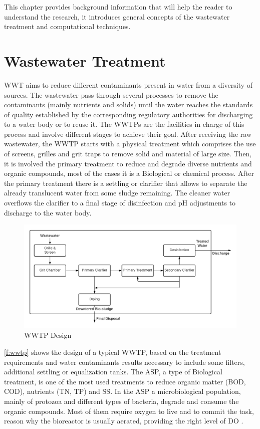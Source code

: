 This chapter provides background information that will help the reader to understand the research, it introduces general concepts of the wastewater treatment and computational techniques. 

\section{Wastewater Treatment}
\label{s:First-Background-Topic}

\ac{WWT} aims to reduce different contaminants present in water from a diversity of sources. The wastewater pass through several processes to remove the contaminants (mainly nutrients and solids) until the water reaches the standards of quality established by the corresponding regulatory authorities for discharging to a water body or to reuse it. The \ac{WWTP}s are the facilities in charge of this process and involve different stages to achieve their goal. After receiving the raw wastewater, the \ac{WWTP} starts with a physical treatment which comprises the use of screens, grilles and grit traps to remove solid and material of large size. Then, it is involved the primary treatment to reduce and degrade diverse nutrients and organic compounds, most of the cases it is a Biological or chemical process. After the primary treatment there is a settling or clarifier that allows to separate the already translucent water from some sludge remaining. The cleaner water overflows the clarifier to a final stage of disinfection and pH adjustments to discharge to the water body.

\begin{figure}[h]
\centering
\includegraphics[width=14cm]{figures/Ch2/WWTP.png}
\caption{WWTP Design}
\label{f:wwtp}
\end{figure}

\autoref{f:wwtp} shows the design of a typical \ac{WWTP}, based on the treatment requirements and water contaminants results necessary to include some filters, additional settling or equalization tanks.
The \ac{ASP}, a type of Biological treatment, is one of the most used treatments to reduce organic matter (\ac{BOD}, \ac{COD}), nutrients (\ac{TN}, \ac{TP}) and \ac{SS}. In the \ac{ASP} a microbiological population, mainly of protozoa and different types of bacteria, degrade and consume the organic compounds. Most of them require oxygen to live and to commit the task, reason why the bioreactor is usually aerated, providing the right level of \ac{DO} \cite{Haimi2013}.

